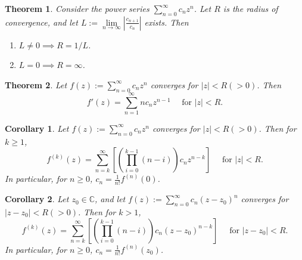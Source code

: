 \documentclass[12pt,openany]{book}
\newtheorem{theorem}{Theorem}[chapter]
\newtheorem{corollary}{Corollary}[theorem]
\theoremstyle{definition}
\newcommand{\C}{\mathbb{C}}
\newcommand{\of}[1]{\left( #1 \right)}
\newcommand{\abs}[1]{\left\lvert #1 \right\rvert}
\begin{document}
	\vspace{8pt}
	\begin{tcolorbox}[colback=white,colframe=thmcolor,arc=5pt,title={\color{white}\bf }]
		\begin{theorem}
			Consider the power series $\sum_{n=0}^\infty c_nz^n$. Let $R$ is the radius of convergence, and let $L:=\lim\limits_{n\to\infty}\abs{\frac{c_{n+1}}{c_n}}$ exists. Then \begin{enumerate}[(1)]
				\item $L\neq 0\implies R=1/L$.
				\item $L=0\implies R=\infty$.
			\end{enumerate}
		\end{theorem}
	\end{tcolorbox}
	\vspace{8pt}
	\begin{tcolorbox}[colback=white,colframe=thmcolor,arc=5pt,title={\color{white}\bf }]
		\begin{theorem}
			Let $f(z):=\sum_{n=0}^\infty c_nz^n$ converges for $\abs{z}<R(>0)$. Then \[
			f'(z)=\sum_{n=1}^\infty nc_nz^{n-1}\quad\text{ for $\abs{z}<R$.}
			\]
		\end{theorem}
	\end{tcolorbox}
	\vspace{4pt}
	\begin{tcolorbox}[colback=white,colframe=corcolor,arc=5pt,title={\color{white}\bf }]
		\begin{corollary}
			Let $f(z):=\sum_{n=0}^\infty c_nz^n$ converges for $\abs{z}<R(>0)$. Then for $k\geq 1$, \[
			f^{(k)}(z)=\sum_{n=k}^\infty\left[\of{\prod_{i=0}^{k-1}(n-i)}c_nz^{n-k}\right]\quad\text{ for $\abs{z}<R$.}
			\] In particular, for $n\geq 0$, $c_n=\displaystyle\frac{1}{n!}f^{(n)}(0)$.
		\end{corollary}
	\end{tcolorbox}
	\vspace{4pt}
	\begin{tcolorbox}[colback=white,colframe=corcolor,arc=5pt,title={\color{white}\bf }]
		\begin{corollary}
			Let $z_0\in\C$, and let $f(z):=\sum_{n=0}^\infty c_n\of{z-z_0}^n$ converges for $\abs{z-z_0}<R(>0)$. Then for $k>1$, \[
			f^{(k)}(z)=\sum_{n=k}^\infty\left[\of{\prod_{i=0}^{k-1}(n-i)}c_n\of{z-z_0}^{n-k}\right]\quad\text{ for $\abs{z-z_0}<R$.}
			\] In particular, for $n\geq 0$, $c_n=\displaystyle\frac{1}{n!}f^{(n)}(z_0)$.
		\end{corollary}
	\end{tcolorbox}
	
\end{document}
